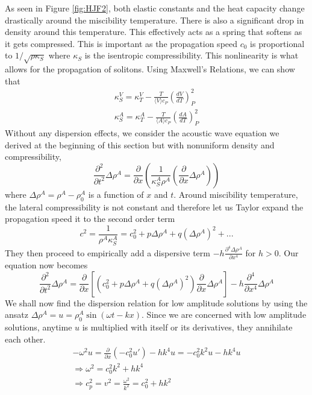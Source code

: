 \documentclass{article}
\newcommand{\pd}[2]{\frac{\partial #1}{\partial #2}}
\newcommand{\od}[2]{\frac{d #1}{d #2}}
\newcommand{\pdt}[2]{\frac{\partial ^2 #1}{\partial #2 ^2}}
\newcommand{\pdfo}[2]{\frac{\partial ^4 #1}{\partial #2^4}}
\numberwithin{equation}{section}
\begin{document}
As seen in Figure \ref{fig:HJF2}, both elastic constants and the heat capacity change drastically around the miscibility temperature. There is also a significant drop in density around this temperature. This effectively acts as a spring that softens as it gets compressed. This is important as the propagation speed $c_0$ is proportional to $1/\sqrt{\rho \kappa_S}$ where $\kappa_S$ is the isentropic compressibility. This nonlinearity is what allows for the propagation of solitons. Using Maxwell's Relations, we can show that 
\begin{equation}
\begin{split}
    \kappa_S^V = \kappa_T^V - \frac{T}{\langle V \rangle c_P}\left( \od{V}{T} \right)^2_P \\
    \kappa_S^A = \kappa_T^A - \frac{T}{\langle A \rangle c_P}\left( \od{A}{T} \right)^2_P
\end{split}
\end{equation}
Without any dispersion effects, we consider the acoustic wave equation we derived at the beginning of this section but with nonuniform density and compressibility,
\begin{equation}
     \pdt{}{t} \Delta \rho^A = \pd{}{x}\left( \frac{1}{\kappa^A_S\rho^A} \left(\pd{}{x}\Delta \rho^A\right)\right)   
\end{equation}
where $\Delta \rho^A = \rho^A - \rho_0^A$ is a function of $x$ and $t$. Around miscibility temperature, the lateral compressibility is not constant and therefore let us Taylor expand the propagation speed it to the second order term
\begin{equation}
    c^2 = \frac{1}{\rho^A \kappa^A_S} = c_0^2+p\Delta\rho^A + q(\Delta\rho^A)^2+...
\end{equation}
They then proceed to empirically add a dispersive term $-h\pdfo{\Delta \rho^A}{x}$ for $h>0$. Our equation now becomes 
\begin{equation}
        \pdt{}{t}\Delta \rho^A = \pd{}{x}\left[ (c_0^2+p\Delta \rho^A +q (\Delta \rho^A)^2)\pd{}{x}\Delta \rho^A\right] - h \pdfo{}{x}\Delta \rho^A
\end{equation}
We shall now find the dispersion relation for low amplitude solutions by using the ansatz $\Delta \rho^A = u=\rho_0^A \sin (\omega t-kx)$. Since we are concerned with low amplitude solutions, anytime $u$ is multiplied with itself or its derivatives, they annihilate each other.
\begin{equation}
\begin{split}
    -\omega^2u = \pd{}{x}(-c_0^2u')-hk^4u =-c_0^2k^2u-hk^4u\\
    \Rightarrow \omega^2 = c_0^2k^2+hk^4\\
    \Rightarrow c_p^2 = v^2 = \frac{\omega^2}{k^2}=c_0^2+hk^2
\end{split}
\end{equation}
\end{document}
